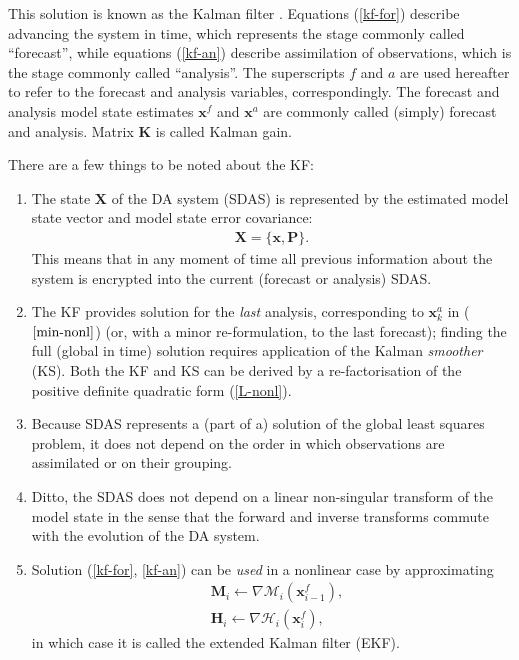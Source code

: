 \documentclass[11pt]{report}
\newcommand{\mb} {\mathbf}
\begin{document}
This solution is known as the Kalman filter \citep[KF,][]{kal60}.
Equations (\ref{kf-for}) describe advancing the system in time, which represents the stage commonly called ``forecast'', while equations (\ref{kf-an}) describe assimilation of observations, which is the stage commonly called ``analysis''.
The superscripts $f$ and $a$ are used hereafter to refer to the forecast and analysis variables, correspondingly.
The forecast and analysis model state estimates $\mb x^f$ and $\mb x^a$ are commonly called (simply) forecast and analysis.
Matrix $\mb K$ is called Kalman gain.

There are a few things to be noted about the KF:
\begin{enumerate}
\item The state $\mb X$ of the DA system (SDAS) is represented by the estimated model state vector and model state error covariance: 
\begin{align}
  \label{sdas}
  \mb X = \{\mb x, \mb P\}.
\end{align}
This means that in any moment of time all previous information about the system is encrypted into the current (forecast or analysis) SDAS.
\item The KF provides solution for the \emph{last} analysis, corresponding to $\mb x_k^a$ in ($\ref{min-nonl}$) (or, with a minor re-formulation, to the last forecast); finding the full (global in time) solution requires application of the Kalman \emph{smoother} (KS).
Both the KF and KS can be derived by a re-factorisation of the positive definite quadratic form (\ref{L-nonl}).
\item Because SDAS represents a (part of a) solution of the global least squares problem, it does not depend on the order in which observations are assimilated or on their grouping.
\item Ditto, the SDAS does not depend on a linear non-singular transform of the model state in the sense that the forward and inverse transforms commute with the evolution of the DA system.
\item Solution (\ref{kf-for}, \ref{kf-an}) can be \emph{used} in a nonlinear case by approximating
\begin{align*}
  &\mb M_{i} \leftarrow \nabla \mathcal M_i(\mb x_{i-1}^f),\\
  &\mb H_{i} \leftarrow \nabla \mathcal H_i(\mb x_i^f),
\end{align*}
in which case it is called the extended Kalman filter (EKF).
\end{enumerate}
\end{document}
